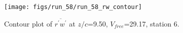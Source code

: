 \begin{figure}[H]
\centering
\texttt{[image: figs/run\_58/run\_58\_rw\_contour]}
\caption{Contour plot of $\overline{r^\prime w^\prime}$ at $z/c$=9.50, $V_{free}$=29.17, station 6.}
\end{figure}


